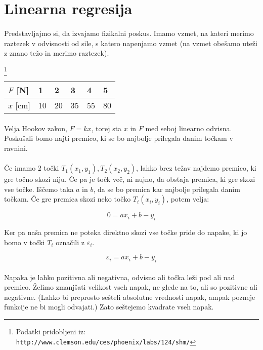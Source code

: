 \documentclass[a4paper, 12pt]{article}
\begin{document}
	\section*{Linearna regresija}
	\paragraph{}
	Predstavljajmo si, da izvajamo fizikalni poskus. Imamo vzmet, na kateri merimo raztezek v odvisnosti od sile, s katero napenjamo vzmet (na vzmet obešamo uteži z znano težo in merimo raztezek). 

	\footnote{Podatki pridobljeni iz: \texttt{http://www.clemson.edu/ces/phoenix/labs/124/shm/}}
	\begin{tabular}{l|lllll}
		$F$ {[}N{]}  & 1  & 2  & 3  & 4  & 5  \\ \hline
		$x$ {[}cm{]} & 10 & 20 & 35 & 55 & 80
	\end{tabular}

	\paragraph{}
	Velja Hookov zakon, $F = k x$, torej sta $x$ in $F$ med seboj linearno odvisna. Poskušali bomo najti premico, ki se bo najbolje prilegala danim točkam v ravnini.

	\paragraph{}
	Če imamo 2 točki $T_1(x_1, y_1), T_2(x_2, y_2)$, lahko brez težav najdemo premico, ki gre točno skozi niju. Če pa je točk več, ni nujno, da obstaja premica, ki gre skozi vse točke.
	Iščemo taka $a$ in $b$, da se bo premica kar najbolje prilegala danim točkam. Če gre premica skozi neko točko $T_i(x_i, y_i)$, potem velja:

	$$0 = a x_i + b - y_i$$

	Ker pa naša premica ne poteka direktno skozi vse točke pride do napake, ki jo bomo v točki $T_i$ označili z $\varepsilon_i$.

	$$\varepsilon_i = a x_i + b - y_i$$

	\paragraph{}
	Napaka je lahko pozitivna ali negativna, odvisno ali točka leži pod ali nad premico. Želimo zmanjšati velikost vseh napak, ne glede na to, ali so pozitivne ali negativne. (Lahko bi preprosto sešteli absolutne vrednosti napak, ampak pozneje funkcije ne bi mogli odvajati.) Zato seštejemo kvadrate vseh napak.
\end{document}
